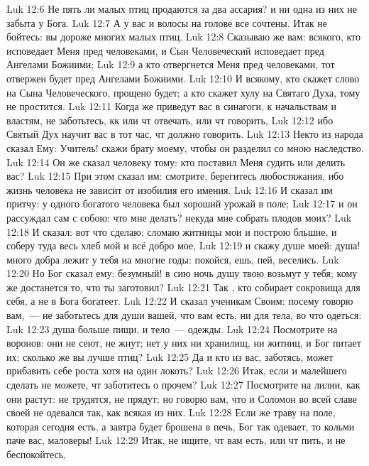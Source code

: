 \vs Luk 12:6 Не пять ли малых птиц продаются за два ассария? и ни одна из них не забыта у Бога.
\vs Luk 12:7 А у вас и волосы на голове все сочтены. Итак не бойтесь: вы дороже многих малых птиц.
\vs Luk 12:8 Сказываю же вам: всякого, кто исповедает Меня пред человеками, и Сын Человеческий исповедает пред Ангелами Божиими;
\vs Luk 12:9 а кто отвергнется Меня пред человеками, тот отвержен будет пред Ангелами Божиими.
\vs Luk 12:10 И всякому, кто скажет слово на Сына Человеческого, прощено будет; а кто скажет хулу на Святаго Духа, тому не простится.
\vs Luk 12:11 Когда же приведут вас в синагоги, к начальствам и властям, не заботьтесь, кк или чт отвечать, или чт говорить,
\vs Luk 12:12 ибо Святый Дух научит вас в тот час, чт должно говорить.
\rsbpar\vs Luk 12:13 Некто из народа сказал Ему: Учитель! скажи брату моему, чтобы он разделил со мною наследство.
\vs Luk 12:14 Он же сказал человеку тому: кто поставил Меня судить или делить вас?
\vs Luk 12:15 При этом сказал им: смотрите, берегитесь любостяжания, ибо жизнь человека не зависит от изобилия его имения.
\vs Luk 12:16 И сказал им притчу: у одного богатого человека был хороший урожай в поле;
\vs Luk 12:17 и он рассуждал сам с собою: что мне делать? некуда мне собрать плодов моих?
\vs Luk 12:18 И сказал: вот что сделаю: сломаю житницы мои и построю бльшие, и соберу туда весь хлеб мой и всё добро мое,
\vs Luk 12:19 и скажу душе моей: душа! много добра лежит у тебя на многие годы: покойся, ешь, пей, веселись.
\vs Luk 12:20 Но Бог сказал ему: безумный! в сию ночь душу твою возьмут у тебя; кому же достанется то, что ты заготовил?
\vs Luk 12:21 Так , кто собирает сокровища для себя, а не в Бога богатеет.
\vs Luk 12:22 И сказал ученикам Своим: посему говорю вам,~--- не заботьтесь для души вашей, что вам есть, ни для тела, во что одеться:
\vs Luk 12:23 душа больше пищи, и тело~--- одежды.
\vs Luk 12:24 Посмотрите на воронов: они не сеют, не жнут; нет у них ни хранилищ, ни житниц, и Бог питает их; сколько же вы лучше птиц?
\vs Luk 12:25 Да и кто из вас, заботясь, может прибавить себе роста хотя на один локоть?
\vs Luk 12:26 Итак, если и малейшего сделать не можете, чт заботитесь о прочем?
\vs Luk 12:27 Посмотрите на лилии, как они растут: не трудятся, не прядут; но говорю вам, что и Соломон во всей славе своей не одевался так, как всякая из них.
\vs Luk 12:28 Если же траву на поле, которая сегодня есть, а завтра будет брошена в печь, Бог так одевает, то кольми паче вас, маловеры!
\vs Luk 12:29 Итак, не ищите, чт вам есть, или чт пить, и не беспокойтесь,
